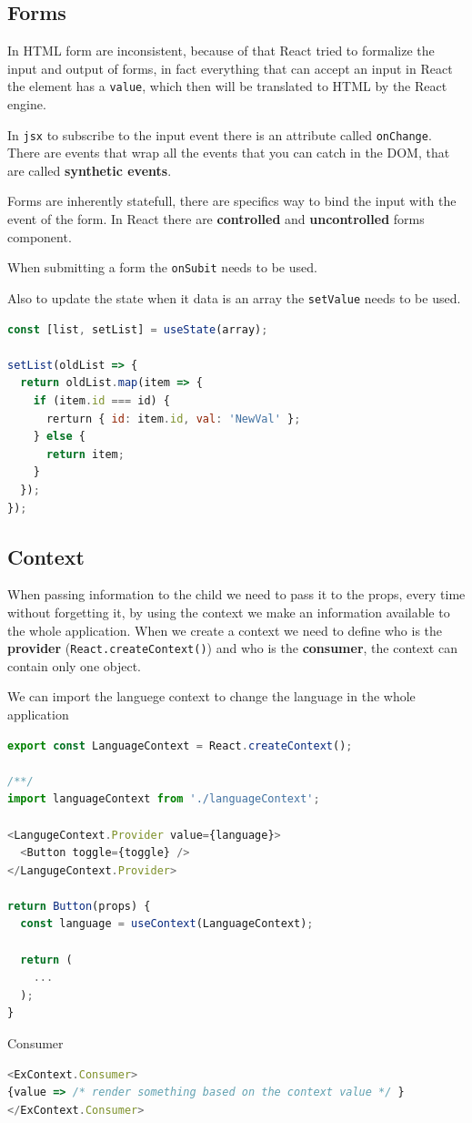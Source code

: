 \documentclass[12pt]{article}
\begin{document}
\subsection{Forms}
In HTML form are inconsistent, because of that React tried to formalize the input and output of forms, in fact everything that can accept an input in React the element has a \texttt{value}, which then will be translated to HTML by the React engine.

In \texttt{jsx} to subscribe to the input event there is an attribute called \texttt{onChange}. There are events that wrap all the events that you can catch in the DOM, that are called \textbf{synthetic events}.

Forms are inherently statefull, there are specifics way to bind the input with the event of the form. In React there are \textbf{controlled} and \textbf{uncontrolled} forms component.

When submitting a form the \texttt{onSubit} needs to be used.

Also to update the state when it data is an array the \texttt{setValue} needs to be used.
\begin{lstlisting}[language=js]
const [list, setList] = useState(array);

setList(oldList => {
  return oldList.map(item => {
    if (item.id === id) {
      rerturn { id: item.id, val: 'NewVal' };
    } else {
      return item;
    }
  });
});
\end{lstlisting}


\subsection{Context}
When passing information to the child we need to pass it to the props, every time without forgetting it, by using the context we make an information available to the whole application. When we create a context we need to define who is the \textbf{provider} (\texttt{React.createContext()}) and who is the \textbf{consumer}, the context can contain only one object.
\begin{example}{}{}
  We can import the languege context to change the language in the whole application
\begin{lstlisting}[language=js]
export const LanguageContext = React.createContext();

/**/
import languageContext from './languageContext';

<LangugeContext.Provider value={language}>
  <Button toggle={toggle} />
</LangugeContext.Provider>

return Button(props) {
  const language = useContext(LanguageContext);

  return (
    ...
  );
}
\end{lstlisting}
   
  Consumer
  \begin{lstlisting}[language=js]
<ExContext.Consumer>
{value => /* render something based on the context value */ } 
</ExContext.Consumer>
  \end{lstlisting}
  
\end{example}
\end{document}
